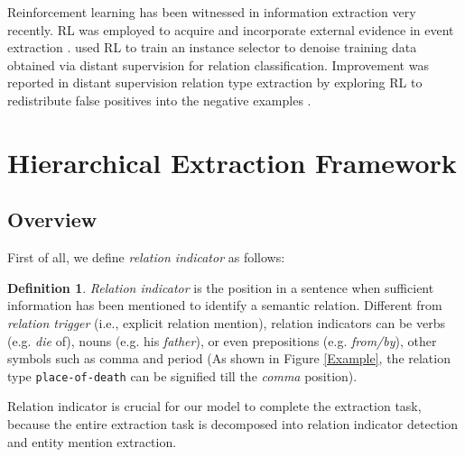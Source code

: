 \documentclass[letterpaper]{article} %
\theoremstyle{definition}
\newtheorem{defn}{Definition}[]
\begin{document}
Reinforcement learning has been witnessed in information extraction very recently. RL was employed to acquire and incorporate external evidence in event extraction \cite{narasimhan2016improving}. \citeauthor{feng2018reinforcement}  used RL to train an instance selector to denoise training data obtained via distant supervision for relation classification. 
Improvement was reported in distant supervision relation type extraction by exploring RL to redistribute false positives into the negative examples \cite{qin2018robust}.

\section{Hierarchical Extraction Framework}
 

\subsection{Overview}

First of all, we define \textit{relation indicator} as follows:
\begin{defn}
    \textit{Relation indicator} is the position in a sentence when sufficient information has been mentioned to identify a semantic relation. Different from \textit{relation trigger} (i.e., explicit relation mention), relation indicators can be verbs (e.g. \textit{die} of), nouns (e.g. his \textit{father}), or even prepositions (e.g. \textit{from/by}), other symbols such as comma and period (As shown in Figure \ref{Example}, the relation type \texttt{place-of-death} can be signified till the {\it comma} position).
\label{define:relation_indicator}  %
\end{defn}
Relation indicator is crucial for our model to complete the extraction task, because the entire extraction task is decomposed into relation indicator detection and entity mention extraction.
\end{document}
